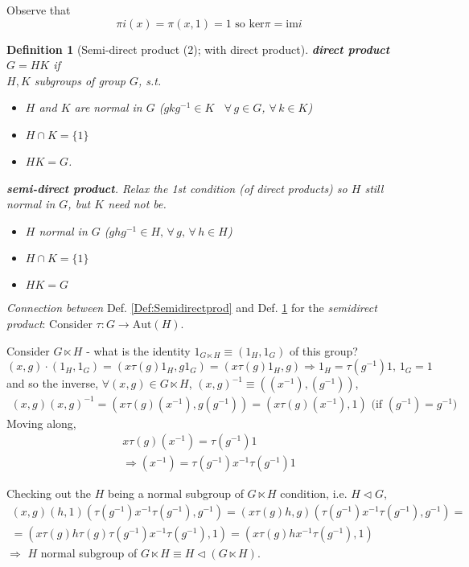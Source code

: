 \documentclass[10pt]{amsart}
\newtheorem{definition}{Definition}
\begin{document}
\begin{multicols*}{2}
\begin{itemize}
Observe that 
\[
\pi i(x) = \pi(x,1)=1 \text{ so } \text{ker}\pi = \text{im}i
\]

\begin{definition}[Semi-direct product (2); with direct product]\label{Def:Semidirectprod2}
	\textbf{direct product} $G=HK$ if \\
$H,K$ subgroups of group $G$, s.t. \\
\begin{itemize}
\item $H$ and $K$ are normal in $G$ ($gkg^{-1} \in K$ \, $\forall \, g\in G$, $\forall \, k \in K$)  
\item $H\cap K = \lbrace 1 \rbrace$  
\item $HK=G$.  
\end{itemize} 

\textbf{semi-direct product}.  Relax the 1st condition (of direct products) so $H$ still normal in $G$, but $K$ need not be.  \\
\begin{itemize}
\item $H$ normal in $G$ ($ghg^{-1} \in H, \, \forall \, g , \, \forall \, h \in H$)  
\item $H\cap K = \lbrace 1 \rbrace$ 
\item $HK = G$
\end{itemize}
\end{definition}

\emph{Connection between} Def. \ref{Def:Semidirectprod} and Def. \ref{Def:Semidirectprod2} for the \emph{semidirect product}:  Consider $\tau : G \to \text{Aut}(H)$.  

Consider $G \ltimes H$ - what is the identity $1_{G\ltimes H} \equiv (1_H,1_G)$ of this group?  
\[
(x,g)\cdot (1_H,1_G) = (x\tau(g) 1_H, g1_G) = (x\tau(g)1_H, g) \Longrightarrow 1_H = \tau(g^{-1})1, \, 1_G=1
\]
and so the inverse, $\forall (x,g) \in G\ltimes H$, $(x,g)^{-1} \equiv ((x^{-1}), (g^{-1}))$, 
\[
\begin{gathered}
	(x,g) (x,g)^{-1} = (x\tau(g) (x^{-1}),g(g^{-1}) ) = (x\tau(g)(x^{-1}), 1) \text{ (if $(g^{-1}) = g^{-1}$) }
\end{gathered}
\]
Moving along, 
\[
\begin{gathered}
	x\tau(g) (x^{-1}) = \tau(g^{-1})1 \\
\Longrightarrow (x^{-1}) = \tau(g^{-1}) x^{-1}\tau(g^{-1})1
\end{gathered}
\]

Checking out the $H$ being a normal subgroup of $G\ltimes H$ condition, i.e. $H \lhd G$, 
\[
\begin{gathered}
	(x,g)(h,1)(\tau(g^{-1})x^{-1} \tau(g^{-1}) , g^{-1}) = (x\tau(g)h, g)(\tau(g^{-1})x^{-1}\tau(g^{-1}) , g^{-1}) = \\
= (x\tau(g)h \tau(g)\tau(g^{-1}) x^{-1}\tau(g^{-1}), 1) = (x\tau(g) hx^{-1}\tau(g^{-1}), 1) 
\end{gathered}
\]
$\Longrightarrow$ $H$ normal subgroup of $G\ltimes H \equiv H \lhd (G\ltimes H)$.  


\end{itemize}
\end{multicols*}
\end{document}
